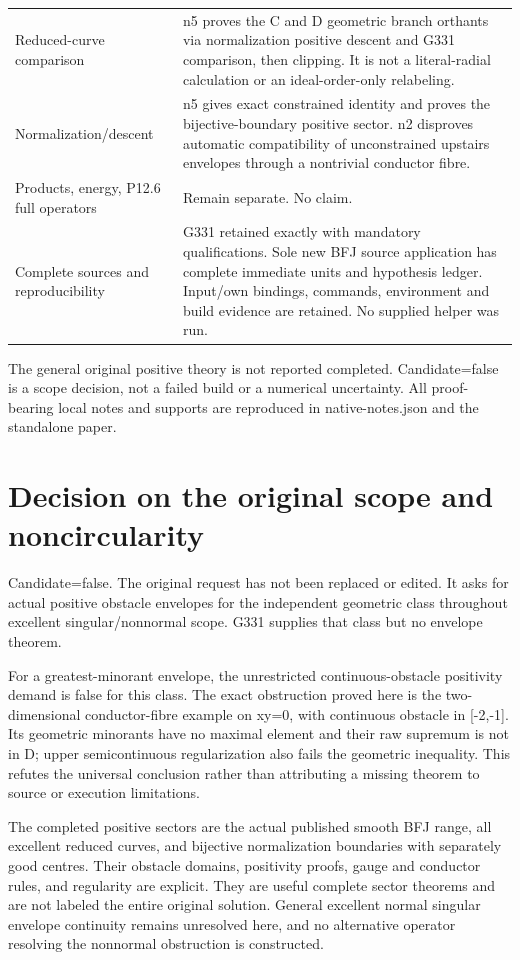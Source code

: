 \documentclass[11pt]{article}
\begin{document}
\begin{longtable}{p{7.10cm}p{7.10cm}}
Reduced-curve comparison & n5 proves the C and D geometric branch orthants via normalization positive descent and G331 comparison, then clipping. It is not a literal-radial calculation or an ideal-order-only relabeling. \\
Normalization/descent & n5 gives exact constrained identity and proves the bijective-boundary positive sector. n2 disproves automatic compatibility of unconstrained upstairs envelopes through a nontrivial conductor fibre. \\
Products, energy, P12.6 full operators & Remain separate. No claim. \\
Complete sources and reproducibility & G331 retained exactly with mandatory qualifications. Sole new BFJ source application has complete immediate units and hypothesis ledger. Input/own bindings, commands, environment and build evidence are retained. No supplied helper was run. \\
\end{longtable}\normalsize

The general original positive theory is not reported completed. Candidate=false is a scope decision, not a failed build or a numerical uncertainty. All proof-bearing local notes and supports are reproduced in native-notes.json and the standalone paper.

\section{Decision on the original scope and noncircularity}

Candidate=false. The original request has not been replaced or edited. It asks for actual positive obstacle envelopes for the independent geometric class throughout excellent singular/nonnormal scope. G331 supplies that class but no envelope theorem.

For a greatest-minorant envelope, the unrestricted continuous-obstacle positivity demand is false for this class. The exact obstruction proved here is the two-dimensional conductor-fibre example on xy=0, with continuous obstacle in [-2,-1]. Its geometric minorants have no maximal element and their raw supremum is not in D; upper semicontinuous regularization also fails the geometric inequality. This refutes the universal conclusion rather than attributing a missing theorem to source or execution limitations.

The completed positive sectors are the actual published smooth BFJ range, all excellent reduced curves, and bijective normalization boundaries with separately good centres. Their obstacle domains, positivity proofs, gauge and conductor rules, and regularity are explicit. They are useful complete sector theorems and are not labeled the entire original solution. General excellent normal singular envelope continuity remains unresolved here, and no alternative operator resolving the nonnormal obstruction is constructed.
\end{document}
